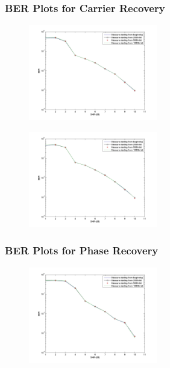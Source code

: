 \documentclass[]{article}
\begin{document}
\subsubsection{BER Plots for Carrier Recovery}
\begin{figure}[H]
\centering
\hspace*{-2cm}\includegraphics[width=0.5\textwidth]{qpBERfo_ddr1.jpg}
\caption{}
\end{figure}

\begin{figure}[H]
\centering
\hspace*{-2cm}\includegraphics[width=0.5\textwidth]{qpBERfo_ddr2.jpg}
\caption{}
\end{figure}

\subsubsection{BER Plots for Phase Recovery}
\begin{figure}[H]
\centering
\hspace*{-2cm}\includegraphics[width=0.5\textwidth]{qpBERpo_ddr1.jpg}
\caption{}
\end{figure}
\end{document}
